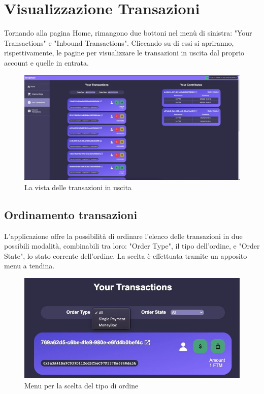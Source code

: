 \section{Visualizzazione Transazioni}

Tornando alla pagina Home, rimangono due bottoni nel menù di sinistra: "Your Transactions" e "Inbound Transactions".
Cliccando su di essi si apriranno, rispettivamente, le pagine per visualizzare le transazioni in uscita dal proprio account e quelle in entrata.

\begin{figure}[H]
    \centering
    \includegraphics[scale=0.4]{immagini/transactionview.jpg}
    \caption{La vista delle transazioni in uscita}
\end{figure}

\subsection{Ordinamento transazioni}

L'applicazione offre la possibilità di ordinare l'elenco delle transazioni in due possibili modalità, combinabili tra loro: 
"Order Type", il tipo dell'ordine, e "Order State", lo stato corrente dell'ordine.
La scelta è effettuata tramite un apposito menu a tendina.

\begin{figure}[H]
    \centering
    \includegraphics[scale=0.4]{immagini/ordertype.jpg}
    \caption{Menu per la scelta del tipo di ordine}
\end{figure}


